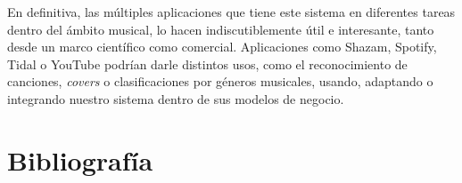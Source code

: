 \documentclass[12pt]{article}
\begin{document}
\bigskip
En definitiva, las múltiples aplicaciones que tiene este sistema en diferentes tareas dentro del ámbito musical, lo hacen indiscutiblemente útil e interesante, tanto desde un marco científico como comercial. 
Aplicaciones como Shazam, Spotify, Tidal o YouTube podrían darle distintos usos, como el reconocimiento de canciones, \textit{covers} o clasificaciones por géneros musicales,
usando, adaptando o integrando nuestro sistema dentro de sus modelos de negocio.


\newpage

\section{Bibliografía}
\label{Bibliografía}
\printbibliography
\end{document}
